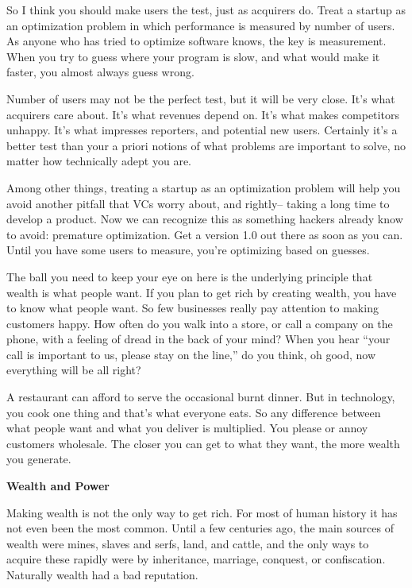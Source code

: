 \documentclass[12pt]{book}
\begin{document}
So I think you should make users the test, just as acquirers do. Treat a
startup as an optimization problem in which performance is measured by
number of users. As anyone who has tried to optimize software knows, the
key is measurement. When you try to guess where your program is slow,
and what would make it faster, you almost always guess wrong.

Number of users may not be the perfect test, but it will be very close.
It's what acquirers care about. It's what revenues depend on. It's what
makes competitors unhappy. It's what impresses reporters, and potential
new users. Certainly it's a better test than your a priori notions of
what problems are important to solve, no matter how technically adept
you are.

Among other things, treating a startup as an optimization problem will
help you avoid another pitfall that VCs worry about, and rightly--
taking a long time to develop a product. Now we can recognize this as
something hackers already know to avoid: premature optimization. Get a
version 1.0 out there as soon as you can. Until you have some users to
measure, you're optimizing based on guesses.

The ball you need to keep your eye on here is the underlying principle
that wealth is what people want. If you plan to get rich by creating
wealth, you have to know what people want. So few businesses really pay
attention to making customers happy. How often do you walk into a store,
or call a company on the phone, with a feeling of dread in the back of
your mind? When you hear ``your call is important to us, please stay on
the line,'' do you think, oh good, now everything will be all right?

A restaurant can afford to serve the occasional burnt dinner. But in
technology, you cook one thing and that's what everyone eats. So any
difference between what people want and what you deliver is multiplied.
You please or annoy customers wholesale. The closer you can get to what
they want, the more wealth you generate.

\textbf{Wealth and Power}

Making wealth is not the only way to get rich. For most of human history
it has not even been the most common. Until a few centuries ago, the
main sources of wealth were mines, slaves and serfs, land, and cattle,
and the only ways to acquire these rapidly were by inheritance,
marriage, conquest, or confiscation. Naturally wealth had a bad
reputation.
\end{document}
